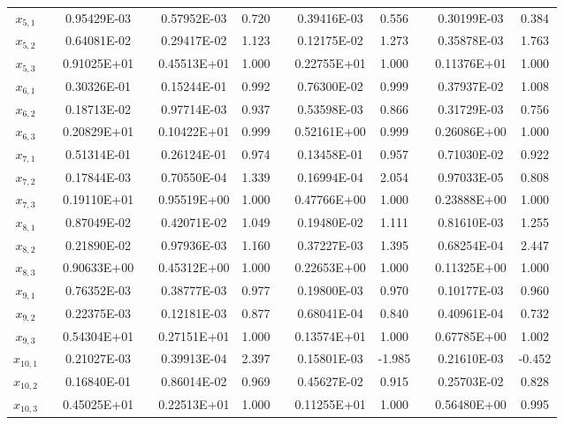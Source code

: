 \begin{table}[t]
\begin{center}
\begin{tabular}{ @{}cccc  cccc  cccc @{} }
$ x_{ 5,1}$  && 0.95429E-03 &&  0.57952E-03 &   0.720  && 0.39416E-03 &   0.556 && 0.30199E-03  &   0.384 \\
$ x_{ 5,2}$  && 0.64081E-02 &&  0.29417E-02 &   1.123  && 0.12175E-02 &   1.273 && 0.35878E-03  &   1.763 \\
$ x_{ 5,3}$  && 0.91025E+01 &&  0.45513E+01 &   1.000  && 0.22755E+01 &   1.000 && 0.11376E+01  &   1.000 \\
$ x_{ 6,1}$  && 0.30326E-01 &&  0.15244E-01 &   0.992  && 0.76300E-02 &   0.999 && 0.37937E-02  &   1.008 \\
$ x_{ 6,2}$  && 0.18713E-02 &&  0.97714E-03 &   0.937  && 0.53598E-03 &   0.866 && 0.31729E-03  &   0.756 \\
$ x_{ 6,3}$  && 0.20829E+01 &&  0.10422E+01 &   0.999  && 0.52161E+00 &   0.999 && 0.26086E+00  &   1.000 \\
$ x_{ 7,1}$  && 0.51314E-01 &&  0.26124E-01 &   0.974  && 0.13458E-01 &   0.957 && 0.71030E-02  &   0.922 \\
$ x_{ 7,2}$  && 0.17844E-03 &&  0.70550E-04 &   1.339  && 0.16994E-04 &   2.054 && 0.97033E-05  &   0.808 \\
$ x_{ 7,3}$  && 0.19110E+01 &&  0.95519E+00 &   1.000  && 0.47766E+00 &   1.000 && 0.23888E+00  &   1.000 \\
$ x_{ 8,1}$  && 0.87049E-02 &&  0.42071E-02 &   1.049  && 0.19480E-02 &   1.111 && 0.81610E-03  &   1.255 \\
$ x_{ 8,2}$  && 0.21890E-02 &&  0.97936E-03 &   1.160  && 0.37227E-03 &   1.395 && 0.68254E-04  &   2.447 \\
$ x_{ 8,3}$  && 0.90633E+00 &&  0.45312E+00 &   1.000  && 0.22653E+00 &   1.000 && 0.11325E+00  &   1.000 \\
$ x_{ 9,1}$  && 0.76352E-03 &&  0.38777E-03 &   0.977  && 0.19800E-03 &   0.970 && 0.10177E-03  &   0.960 \\
$ x_{ 9,2}$  && 0.22375E-03 &&  0.12181E-03 &   0.877  && 0.68041E-04 &   0.840 && 0.40961E-04  &   0.732 \\
$ x_{ 9,3}$  && 0.54304E+01 &&  0.27151E+01 &   1.000  && 0.13574E+01 &   1.000 && 0.67785E+00  &   1.002 \\
$ x_{10,1}$  && 0.21027E-03 &&  0.39913E-04 &   2.397  && 0.15801E-03 &  -1.985 && 0.21610E-03  &  -0.452 \\
$ x_{10,2}$  && 0.16840E-01 &&  0.86014E-02 &   0.969  && 0.45627E-02 &   0.915 && 0.25703E-02  &   0.828 \\
$ x_{10,3}$  && 0.45025E+01 &&  0.22513E+01 &   1.000  && 0.11255E+01 &   1.000 && 0.56480E+00  &   0.995 \\

\end{tabular}
\end{center}
\end{table}
